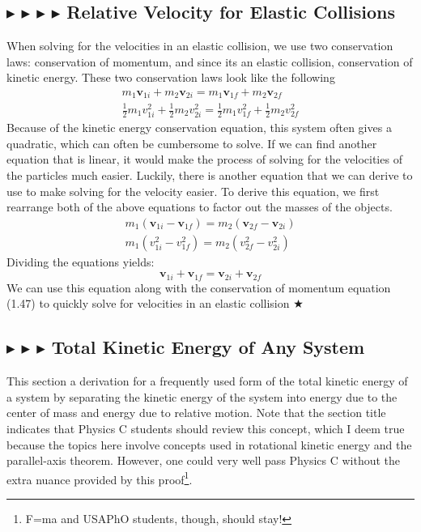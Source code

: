 %
%
\subsection{\color{OrangeRed} $\blacktriangleright$ \color{PineGreen} $\blacktriangleright$ \color{Goldenrod} $\blacktriangleright$ \color{Orchid} $\blacktriangleright$ \color{black} Relative Velocity for Elastic Collisions}\label{1.3.4}
When solving for the velocities in an elastic collision, we use two conservation laws: conservation of momentum, and since its an elastic collision, conservation of kinetic energy. These two conservation laws look like the following
\begin{gather}
    m_1\mathbf{v}_{1i} + m_2\mathbf{v}_{2i} = m_1\mathbf{v}_{1f} + m_2\mathbf{v}_{2f} \\
    \frac12 m_1 v_{1i}^2 + \frac12 m_2 v_{2i}^2 = \frac12 m_1 v_{1f}^2 + \frac12 m_2 v_{2f}^2
\end{gather}
Because of the kinetic energy conservation equation, this system often gives a quadratic, which can often be cumbersome to solve. If we can find another equation that is linear, it would make the process of solving for the velocities of the particles much easier. Luckily, there is another equation that we can derive to use to make solving for the velocity easier. To derive this equation, we first rearrange both of the above equations to factor out the masses of the objects.
\begin{gather*}
    m_1(\mathbf{v}_{1i} - \mathbf{v}_{1f}) = m_2(\mathbf{v}_{2f} - \mathbf{v}_{2i}) \\
    m_1(v_{1i}^2 - v_{1f}^2) = m_2(v_{2f}^2 - v_{2i}^2)
\end{gather*}
\noindent Dividing the equations yields:
\begin{equation}
   \boxed{\mathbf{v}_{1i} + \mathbf{v}_{1f} = \mathbf{v}_{2i} + \mathbf{v}_{2f}} 
\end{equation}
\noindent We can use this equation along with the conservation of momentum equation (1.47) to quickly solve for velocities in an elastic collision $\bigstar$


%
%
\subsection{\color{PineGreen} $\blacktriangleright$ \color{Goldenrod} $\blacktriangleright$ \color{Orchid} $\blacktriangleright$ \color{black} Total Kinetic Energy of Any System} \label{1.3.5}
This section a derivation for a frequently used form of the total kinetic energy of a system by separating the kinetic energy of the system into energy due to the center of mass and energy due to relative motion. Note that the section title indicates that Physics C students should review this concept, which I deem true because the topics here involve concepts used in rotational kinetic energy and the parallel-axis theorem. However, one could very well pass Physics C without the extra nuance provided by this proof\footnote{F=ma and USAPhO students, though, should stay!}.

